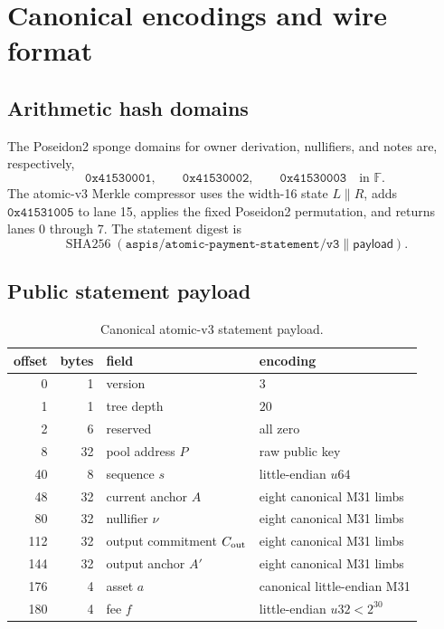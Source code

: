 \section{Canonical encodings and wire format}
\label{app:wire}

\subsection{Arithmetic hash domains}

The Poseidon2 sponge domains for owner derivation, nullifiers, and notes are,
respectively,
\[
 \mathtt{0x41530001},\qquad
 \mathtt{0x41530002},\qquad
 \mathtt{0x41530003}
 \quad\text{in }\mathbb F.
\]
The atomic-v3 Merkle compressor uses the width-16 state
\(L\|R\), adds \(\mathtt{0x41531005}\) to lane 15, applies the fixed
Poseidon2 permutation, and returns lanes 0 through 7.  The statement digest is
\[
 \operatorname{SHA256}(
   \mathtt{aspis/atomic\mbox{-}payment\mbox{-}statement/v3}\|\mathsf{payload}).
\]

\subsection{Public statement payload}

\begin{table}[ht]
\centering
\caption{Canonical atomic-v3 statement payload.}
\label{tab:statement-wire-appendix}
\begin{tabular}{@{}rrll@{}}
\toprule
offset & bytes & field & encoding \\
\midrule
0 & 1 & version & \(3\) \\
1 & 1 & tree depth & \(20\) \\
2 & 6 & reserved & all zero \\
8 & 32 & pool address \(P\) & raw public key \\
40 & 8 & sequence \(s\) & little-endian \(u64\) \\
48 & 32 & current anchor \(A\) & eight canonical M31 limbs \\
80 & 32 & nullifier \(\nu\) & eight canonical M31 limbs \\
112 & 32 & output commitment \(C_{\rm out}\) & eight canonical M31 limbs \\
144 & 32 & output anchor \(A'\) & eight canonical M31 limbs \\
176 & 4 & asset \(a\) & canonical little-endian M31 \\
180 & 4 & fee \(f\) & little-endian \(u32<2^{30}\) \\
\bottomrule
\end{tabular}
\end{table}

